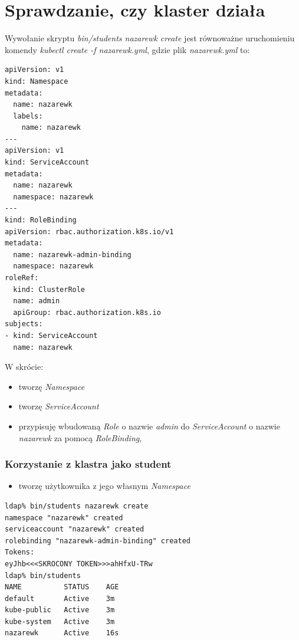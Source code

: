 \documentclass[a4paper,12pt,twoside,openany]{report}
\providecommand{\tightlist}{%
  \setlength{\itemsep}{0pt}\setlength{\parskip}{0pt}}
\begin{document}
\hypertarget{sprawdzanie-czy-klaster-dziaux142a}{%
\section{Sprawdzanie, czy klaster
działa}\label{sprawdzanie-czy-klaster-dziaux142a}}

Wywołanie skryptu \emph{bin/students nazarewk create} jest równoważne
uruchomieniu komendy \emph{kubectl create -f nazarewk.yml}, gdzie plik
\emph{nazarewk.yml} to:

\begin{lstlisting}
apiVersion: v1
kind: Namespace
metadata:
  name: nazarewk
  labels:
    name: nazarewk
---
apiVersion: v1
kind: ServiceAccount
metadata:
  name: nazarewk
  namespace: nazarewk
---
kind: RoleBinding
apiVersion: rbac.authorization.k8s.io/v1
metadata:
  name: nazarewk-admin-binding
  namespace: nazarewk
roleRef:
  kind: ClusterRole
  name: admin
  apiGroup: rbac.authorization.k8s.io
subjects:
- kind: ServiceAccount
  name: nazarewk
\end{lstlisting}

W skrócie:

\begin{itemize}
\tightlist
\item
  tworzę \emph{Namespace}
\item
  tworzę \emph{ServiceAccount}
\item
  przypisuję wbudowaną \emph{Role} o nazwie \emph{admin} do
  \emph{ServiceAccount} o nazwie \emph{nazarewk} za pomocą
  \emph{RoleBinding},
\end{itemize}

\hypertarget{korzystanie-z-klastra-jako-student}{%
\subsubsection{Korzystanie z klastra jako
student}\label{korzystanie-z-klastra-jako-student}}

\begin{itemize}
\tightlist
\item
  tworzę użytkownika z jego własnym \emph{Namespace}
\end{itemize}

\begin{lstlisting}
ldap% bin/students nazarewk create
namespace "nazarewk" created
serviceaccount "nazarewk" created
rolebinding "nazarewk-admin-binding" created
Tokens:
eyJhb<<<SKROCONY TOKEN>>>ahHfxU-TRw
ldap% bin/students
NAME          STATUS    AGE
default       Active    3m
kube-public   Active    3m
kube-system   Active    3m
nazarewk      Active    16s
\end{lstlisting}
\end{document}
